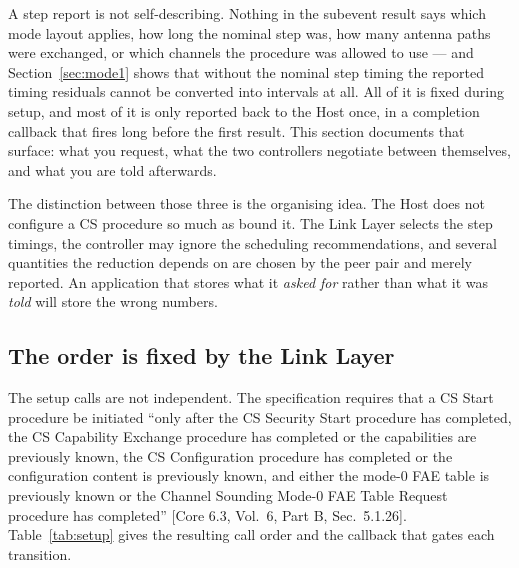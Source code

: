 \documentclass[11pt,a4paper]{article}
\newcommand{\core}[1]{\textcolor{rulegrey}{\small[Core 6.3, #1]}}
\begin{document}
A step report is not self-describing. Nothing in the subevent result says which mode layout applies,
how long the nominal step was, how many antenna paths were exchanged, or which channels the
procedure was allowed to use --- and Section~\ref{sec:mode1} shows that without the nominal step
timing the reported timing residuals cannot be converted into intervals at all. All of it is fixed
during setup, and most of it is only reported back to the Host once, in a completion callback that
fires long before the first result. This section documents that surface: what you request, what the
two controllers negotiate between themselves, and what you are told afterwards.

The distinction between those three is the organising idea. The Host does not configure a CS
procedure so much as bound it. The Link Layer selects the step timings, the controller may ignore
the scheduling recommendations, and several quantities the reduction depends on are chosen by the
peer pair and merely reported. An application that stores what it \emph{asked for} rather than what
it was \emph{told} will store the wrong numbers.

\subsection{The order is fixed by the Link Layer}
\label{sec:setuporder}

The setup calls are not independent. The specification requires that a CS Start procedure be
initiated ``only after the CS Security Start procedure has completed, the CS Capability Exchange
procedure has completed or the capabilities are previously known, the CS Configuration procedure has
completed or the configuration content is previously known, and either the mode-0 FAE table is
previously known or the Channel Sounding Mode-0 FAE Table Request procedure has completed''
\core{Vol.\ 6, Part B, Sec.\ 5.1.26}. Table~\ref{tab:setup} gives the resulting call order and the
callback that gates each transition.
\end{document}
